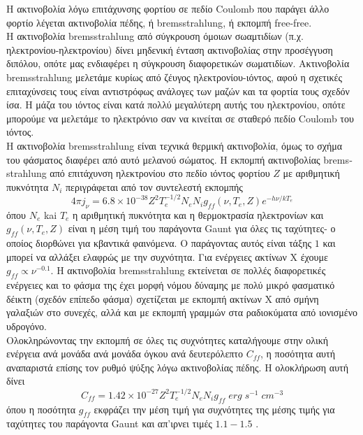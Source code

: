 Η ακτινοβολία λόγω επιτάχυνσης φορτίου σε πεδίο \textlatin{Coulomb} που παράγει άλλο φορτίο λέγεται ακτινοβολία πέδης, ή \textlatin{bremsstrahlung}, ή εκπομπή \textlatin{free-free}.\\
H ακτινοβολία \textlatin{bremsstrahlung} από σύγκρουση όμοιων σωαμτιδίων (π.χ. ηλεκτρονίου-ηλεκτρονίου) δίνει μηδενική ένταση ακτινοβολίας στην προσέγγυση διπόλου, οπότε μας ενδιαφέρει η σύγκρουση διαφορετικών σωματιδίων. Ακτινοβολία \textlatin{bremsstrahlung} μελετάμε κυρίως από ζέυγος ηλεκτρονίου-ιόντος, αφού η σχετικές επιταχύνσεις τους είναι αντιστρόφως ανάλογες των μαζών και τα φορτία τους σχεδόν ίσα. Η μάζα του ιόντος είναι κατά πολλύ μεγαλύτερη αυτής του ηλεκτρονίου, οπότε μπορούμε να μελετάμε το ηλεκτρόνιο σαν να κινείται σε σταθερό πεδίο  \textlatin{Coulomb} του ιόντος\cite{1986rpa..book.....R}.\\
Η ακτινοβολία \textlatin{bremsstrahlung} είναι τεχνικά θερμική ακτινοβολία, όμως το σχήμα του φάσματος διαφέρει από αυτό μελανού σώματος. Η εκπομπή ακτινοβολίας \textlatin{bremsstrahlung} από επιτάχυνση ηλεκτρονίου στο πεδίο ιόντος φορτίου $Z$ με αριθμητική πυκνότητα $N_i$ περιγράφεται από τον συντελεστή εκπομπής\cite{netzer_2013}
\begin{equation}
    4\pi j_\nu = 6.8\times 10^{-38} Z^2 T_e^{-1/2}N_e N_i g_{ff}(\nu, T_e,Z)e^{-h\nu/kT_e} 
\end{equation}
όπου $N_e$ kai $T_e$ η αριθμητική πυκνότητα και η θερμοκτρασία ηλεκτρονίων και $g_{ff}(\nu, T_e,Z)$ είναι η μέση τιμή του παράγοντα \textlatin{Gaunt} για όλες τις ταχύτητες- ο οποίος διορθώνει για κβαντικά φαινόμενα. Ο παράγοντας αυτός είναι τάξης $1$ και μπορεί να αλλάξει ελαφρώς με την συχνότητα. Για ενέργειες ακτίνων Χ έχουμε $g_{ff} \propto \nu^{-0.1}$. H ακτινοβολία \textlatin{bremsstrahlung} εκτείνεται σε πολλές διαφορετικές ενέργειες και το φάσμα της έχει μορφή νόμου δύναμης με πολύ μικρό φασματικό δέικτη (σχεδόν επίπεδο φάσμα)\cite{netzer_2013} σχετίζεται με εκπομπή ακτίνων Χ από σμήνη γαλαξιών στο συνεχές, αλλά και με εκπομπή γραμμών στα ραδιοκύματα από ιονισμένο υδρογόνο.\\
Ολοκληρώνοντας την εκπομπή σε όλες τις συχνότητες καταλήγουμε στην ολική ενέργεια ανά μονάδα ανά μονάδα όγκου ανά δευτερόλεπτο $C_{ff}$, η ποσότητα αυτή αναπαριστά επίσης τον ρυθμό ψύξης λόγω ακτινοβολίας πέδης. Η ολοκλήρωση αυτή δίνει\cite{netzer_2013}
\begin{equation}
    C_{ff} = 1.42\times 10^{-27} Z^2 T_e^{-1/2}N_e N_i g_{ff} \; erg \;s^{−1}\; cm^{−3}
\end{equation}
όπου η ποσότητα $g_{ff}$ εκφράζει την μέση τιμή για συχνότητες της μέσης τιμής για ταχύτητες του παράγοντα \textlatin{Gaunt} και απ'ιρνει τιμές $1.1-1.5$ \cite{netzer_2013}.

